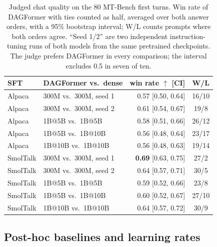 \documentclass[11pt]{article}
\newcommand{\dagf}{DAGFormer}
\begin{document}
\begin{table}[t]
\centering\footnotesize
\setlength{\tabcolsep}{2.2pt}
\begin{tabular}{llrc}
\toprule
SFT & \dagf{} vs.\ dense & win rate $\uparrow$ [CI] & W/L \\
\midrule
Alpaca & 300M vs.\ 300M, seed 1 & 0.57 [0.50, 0.64] & 16/10 \\
Alpaca & 300M vs.\ 300M, seed 2 & 0.61 [0.54, 0.67] & 19/8 \\
Alpaca & 1B@5B vs.\ 1B@5B & 0.58 [0.51, 0.66] & 26/12 \\
Alpaca & 1B@5B vs.\ 1B@10B & 0.56 [0.48, 0.64] & 23/17 \\
Alpaca & 1B@10B vs.\ 1B@10B & 0.56 [0.48, 0.63] & 19/14 \\
SmolTalk & 300M vs.\ 300M, seed 1 & \textbf{0.69} [0.63, 0.75] & 27/2 \\
SmolTalk & 300M vs.\ 300M, seed 2 & 0.64 [0.57, 0.71] & 30/5 \\
SmolTalk & 1B@5B vs.\ 1B@5B & 0.59 [0.52, 0.66] & 23/8 \\
SmolTalk & 1B@5B vs.\ 1B@10B & 0.60 [0.52, 0.67] & 27/10 \\
SmolTalk & 1B@10B vs.\ 1B@10B & 0.64 [0.57, 0.72] & 30/9 \\
\bottomrule
\end{tabular}
\caption{Judged chat quality on the 80 MT-Bench first turns. Win rate of \dagf{} with ties counted as half, averaged over both answer orders, with a 95\% bootstrap interval; W/L counts prompts where both orders agree. ``Seed 1/2'' are two independent instruction-tuning runs of both models from the same pretrained checkpoints. The judge prefers \dagf{} in every comparison; the interval excludes 0.5 in seven of ten.}
\label{tab:chat_full}
\end{table}

\subsection{Post-hoc baselines and learning rates}
\label{app:posthoc}
\end{document}
